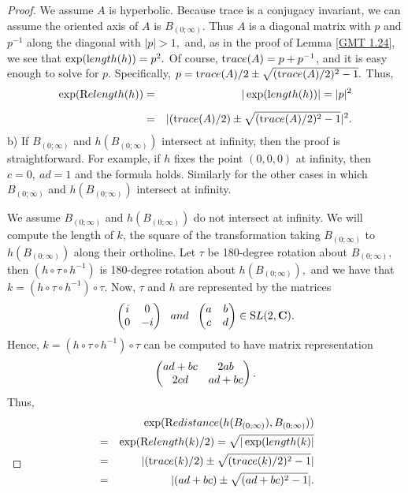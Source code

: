 \begin{remark}
\begin{proof}{}
We assume $A$ is hyperbolic.  Because trace is a conjugacy invariant, we can assume the oriented axis of $A$ is $ B_{(0;\infty)}.$  Thus $A$ is a diagonal matrix with $p$ and $p^{-1}$ along the diagonal with 
$|p| > 1,$ and, as in the proof of Lemma \ref{GMT 1.24}, we see that 
$\exp({\textrm length}(h)) = p^2.$  Of course,  ${\textrm trace}(A)= p + p^{-1}$, and it is easy enough to solve for $p.$   Specifically, 
$p = {\textrm trace}(A)/2 \pm \sqrt{({\textrm trace}(A)/2)^2 - 1}.$
Thus, 
\begin{eqnarray*}
\exp({\textrm Relength} (h))& =& |\exp({\textrm length}(h))|  = 
|p|^2\\[5pt]
&=& |({\textrm trace}(A)/2) \pm \sqrt{({\textrm trace}(A)/2)^2 - 1}|^2.
\end{eqnarray*}
b)  If $ B_{(0;\infty)}$ and $h(B_{(0;\infty)})$ intersect at infinity, then the proof is straightforward.  For example, 
if $h$ fixes the point $(0,0,0)$ at infinity, then $c = 0,\ ad = 1$ and the formula holds.  Similarly for the other cases in which $ B_{(0;\infty)}$ and $h(B_{(0;\infty)})$ intersect at infinity.

We assume $ B_{(0;\infty)}$ and $h(B_{(0;\infty)})$ do not intersect at infinity. We will compute the length of $k$, the square of the transformation taking $ B_{(0;\infty)}$ to $h(B_{(0;\infty)})$ along their ortholine. 
Let $\tau$ be 180-degree rotation about $ B_{(0;\infty)},$ then $(h \circ \tau \circ h^{-1})$ is 180-degree rotation about $h(B_{(0;\infty)}),$ and
we have that  $k = (h \circ \tau \circ h^{-1}) \circ \tau.$   
Now, $\tau$ and $h$ are represented by the matrices 
$$ \left(\begin{matrix} i & 0 \cr 
0  & -i \cr\end{matrix} \right) {\mathrm \ \ and\ \ } 
                         \left(\begin{matrix} a & b \cr 
			 c  & d \cr\end{matrix} \right)  \in {\mathrm SL}(2,{\mathbf C}).$$ 
Hence,   $k = (h \circ \tau \circ h^{-1}) \circ \tau$ can be computed to have matrix
representation $$\left(\begin{matrix} ad + bc & 2ab \cr 
2cd & ad + bc \cr\end{matrix} \right).$$ 
Thus,
\begin{eqnarray*}
&&\hskip-66pt\exp({\textrm Redistance} (h(B_{(0;\infty)}), B_{(0;\infty)}))\\
& = &
\exp(\Relength(k)/2)= \sqrt{|\exp(\length(k)|}\\
& =&
|(\trace(k)/2) \pm \sqrt{(\trace(k)/2)^2 - 1}|\\
& =&
|(ad + bc) \pm \sqrt{(ad + bc)^2 - 1}|. \\
\noalign{\vskip-36pt}
\end{eqnarray*}
\end{proof}


\end{remark}

